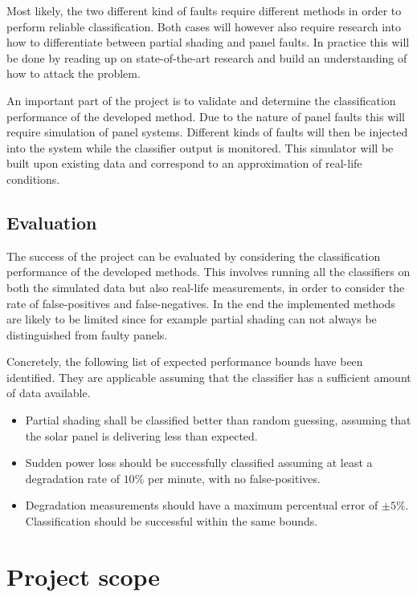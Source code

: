 \documentclass[a4paper,11pt]{article}
\begin{document}
Most likely, the two different kind of faults require different methods in order to perform reliable classification.
Both cases will however also require research into how to differentiate between partial shading and panel faults.
In practice this will be done by reading up on state-of-the-art research and build an understanding of how to attack the problem.

An important part of the project is to validate and determine the classification performance of the developed method.
Due to the nature of panel faults this will require simulation of panel systems.
Different kinds of faults will then be injected into the system while the classifier output is monitored.
This simulator will be built upon existing data and correspond to an approximation of real-life conditions.

\subsection*{Evaluation}
The success of the project can be evaluated by considering the classification performance of the developed methods.
This involves running all the classifiers on both the simulated data but also real-life measurements, in order to consider the rate of false-positives and false-negatives.
In the end the implemented methods are likely to be limited since for example partial shading can not always be distinguished from faulty panels.

Concretely, the following list of expected performance bounds have been identified.
They are applicable assuming that the classifier has a sufficient amount of data available.
\begin{itemize}
\item Partial shading shall be classified better than random guessing, assuming that the solar panel is delivering less than expected.
\item Sudden power loss should be successfully classified assuming at least a degradation rate of $10\%$ per minute, with no false-positives.
\item Degradation measurements should have a maximum percentual error of $\pm 5\%$. Classification should be successful within the same bounds.
\end{itemize}

\section*{Project scope}
\end{document}
